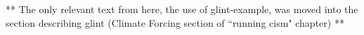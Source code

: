 ** The only relevant text from here, the use of glint-example, was moved into the section describing glint (Climate Forcing section of ``running cism" chapter) **

%
%
%
%
